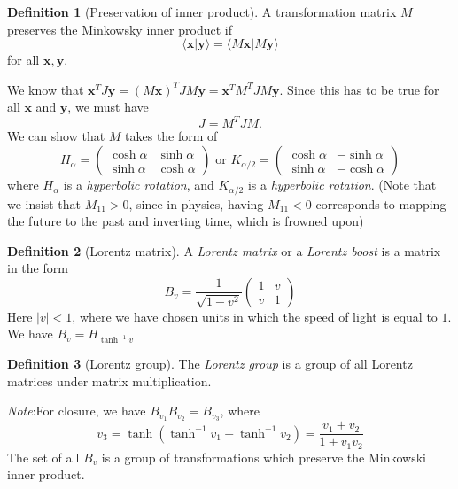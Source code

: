 \documentclass[a4paper]{article}
\theoremstyle{definition}
\newtheorem*{defi}{Definition}
\newcommand{\mb}[1]{\mathbf{#1}}
\newcommand{\note}{\noindent \emph{Note}:\;}
\newcommand{\bra}{\langle}
\newcommand{\ket}{\rangle}
\begin{document}
\begin{defi}[Preservation of inner product]
  A transformation matrix $M$ preserves the Minkowsky inner product if
  \[
  \bra \mb{x}|\mb{y}\ket = \bra M\mb{x} | M\mb{y}\ket
  \]
  for all $\mb{x}, \mb{y}$.
\end{defi}

We know that $\mb{x}^TJ\mb{y} = (M\mb{x})^TJM\mb{y} = \mb{x}^T M^TJM\mb{y}$. Since this has to be true for all $\mb{x}$ and $\mb{y}$, we must have
\[
J = M^TJM.
\]
We can show that $M$ takes the form of
\[
H_\alpha = \begin{pmatrix}
  \cosh \alpha & \sinh \alpha\\
  \sinh \alpha & \cosh \alpha
\end{pmatrix}\text{ or } K_{\alpha/2} = 
\begin{pmatrix}
  \cosh\alpha & -\sinh\alpha\\
  \sinh\alpha & -\cosh\alpha
\end{pmatrix}
\]
where $H_\alpha$ is a \emph{hyperbolic rotation}, and $K_{\alpha/2}$ is a \emph{hyperbolic rotation}. (Note that we insist that $M_{11} > 0$, since in physics, having $M_{11} < 0$ corresponds to mapping the future to the past and inverting time, which is frowned upon)

\begin{defi}[Lorentz matrix]
  A \emph{Lorentz matrix} or a \emph{Lorentz boost} is a matrix in the form 
  \[
  B_v = \frac{1}{\sqrt{1 - v^2}}
  \begin{pmatrix}
    1 & v\\
    v & 1
  \end{pmatrix}
  \]
  Here $|v| < 1$, where we have chosen units in which the speed of light is equal to $1$. We have $B_v = H_{\tanh^{-1}v}$
\end{defi}

\begin{defi}[Lorentz group]
  The \emph{Lorentz group} is a group of all Lorentz matrices under matrix multiplication.
\end{defi}
\note For closure, we have $B_{v_1}B_{v_2} = B_{v_3}$, where
\[
v_3 = \tanh(\tanh^{-1} v_1 + \tanh^{-1} v_2) = \frac{v_1 + v_2}{1 + v_1v_2}
\]
The set of all $B_v$ is a group of transformations which preserve the Minkowski inner product.
\end{document}
